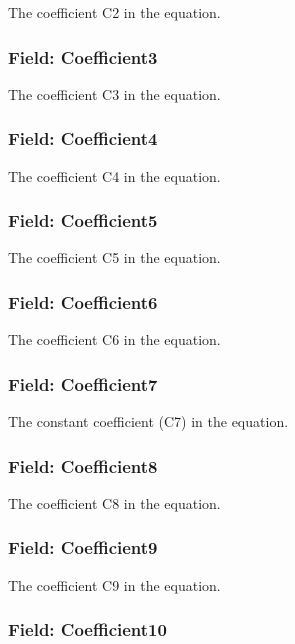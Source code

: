 The coefficient C2 in the equation.

\subsubsection{Field: Coefficient3}\label{field-coefficient3}

The coefficient C3 in the equation.

\subsubsection{Field: Coefficient4}\label{field-coefficient4}

The coefficient C4 in the equation.

\subsubsection{Field: Coefficient5}\label{field-coefficient5}

The coefficient C5 in the equation.

\subsubsection{Field: Coefficient6}\label{field-coefficient6}

The coefficient C6 in the equation.

\subsubsection{Field: Coefficient7}\label{field-coefficient7}

The constant coefficient (C7) in the equation.

\subsubsection{Field: Coefficient8}\label{field-coefficient8}

The coefficient C8 in the equation.

\subsubsection{Field: Coefficient9}\label{field-coefficient9}

The coefficient C9 in the equation.

\subsubsection{Field: Coefficient10}\label{field-coefficient10}

